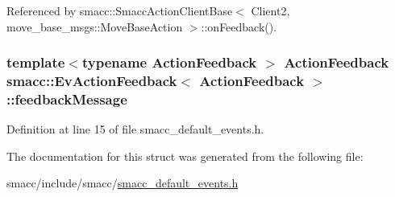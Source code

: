 Referenced by smacc\+::\+Smacc\+Action\+Client\+Base$<$ Client2, move\+\_\+base\+\_\+msgs\+::\+Move\+Base\+Action $>$\+::on\+Feedback().

\subsubsection[{\texorpdfstring{feedback\+Message}{feedbackMessage}}]{\setlength{\rightskip}{0pt plus 5cm}template$<$typename Action\+Feedback $>$ Action\+Feedback {\bf smacc\+::\+Ev\+Action\+Feedback}$<$ Action\+Feedback $>$\+::feedback\+Message}\hypertarget{structsmacc_1_1EvActionFeedback_a9e15b2862ee4e7c2e12407cfb3caa800}{}\label{structsmacc_1_1EvActionFeedback_a9e15b2862ee4e7c2e12407cfb3caa800}


Definition at line 15 of file smacc\+\_\+default\+\_\+events.\+h.



The documentation for this struct was generated from the following file\+:\begin{DoxyCompactItemize}
\item 
smacc/include/smacc/\hyperlink{smacc__default__events_8h}{smacc\+\_\+default\+\_\+events.\+h}\end{DoxyCompactItemize}
